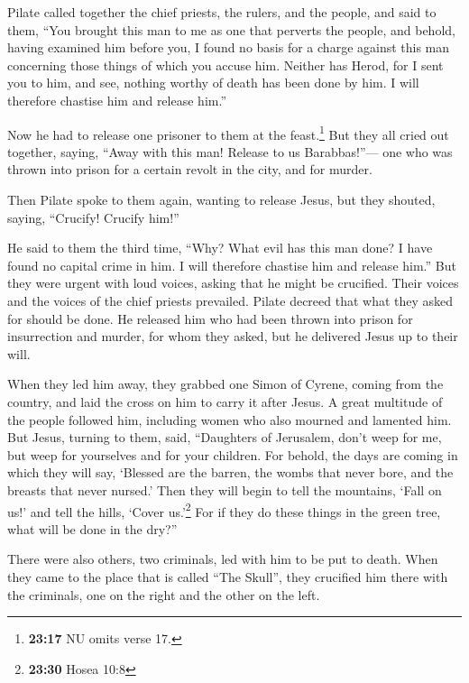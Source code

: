  Pilate called together the chief priests, the rulers,
and the people,  and said to them, ``You brought this man
to me as one that perverts the people, and behold, having examined him
before you, I found no basis for a charge against this man concerning
those things of which you accuse him.  Neither has Herod,
for I sent you to him, and see, nothing worthy of death has been done by
him.  I will therefore chastise him and release him.''

 Now he had to release one prisoner to them at the
feast.\footnote{\textbf{23:17} NU omits verse 17.}  But
they all cried out together, saying, ``Away with this man! Release to us
Barabbas!''---  one who was thrown into prison for a
certain revolt in the city, and for murder.

 Then Pilate spoke to them again, wanting to release
Jesus,  but they shouted, saying, ``Crucify! Crucify
him!''

 He said to them the third time, ``Why? What evil has
this man done? I have found no capital crime in him. I will therefore
chastise him and release him.''  But they were urgent
with loud voices, asking that he might be crucified. Their voices and
the voices of the chief priests prevailed.  Pilate
decreed that what they asked for should be done.  He
released him who had been thrown into prison for insurrection and
murder, for whom they asked, but he delivered Jesus up to their will.

 When they led him away, they grabbed one Simon of
Cyrene, coming from the country, and laid the cross on him to carry it
after Jesus.  A great multitude of the people followed
him, including women who also mourned and lamented him. 
But Jesus, turning to them, said, ``Daughters of Jerusalem, don't weep
for me, but weep for yourselves and for your children. 
For behold, the days are coming in which they will say, `Blessed are the
barren, the wombs that never bore, and the breasts that never nursed.'
 Then they will begin to tell the mountains, `Fall on
us!' and tell the hills, `Cover us.'\footnote{\textbf{23:30} Hosea 10:8}
 For if they do these things in the green tree, what will
be done in the dry?''

 There were also others, two criminals, led with him to
be put to death.  When they came to the place that is
called ``The Skull'', they crucified him there with the criminals, one
on the right and the other on the left.

